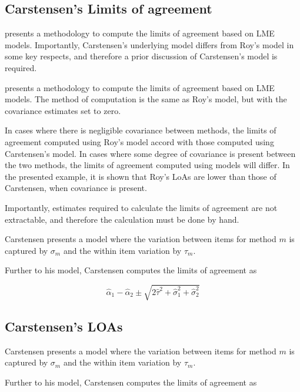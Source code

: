 \documentclass[12pt, a4paper]{report}
\theoremstyle{plain}
\theoremstyle{definition}
\theoremstyle{remark}
\begin{document}
\subsection{Carstensen's Limits of agreement}
\citet{BXC2008} presents a methodology to compute the limits of
agreement based on LME models. Importantly, Carstensen's underlying model differs from Roy's model in some key respects, and therefore a prior discussion of Carstensen's model is required.

\citet{BXC2008} presents a methodology to compute the limits of agreement based on LME models. The method of computation is the same as Roy's model, but with the covariance estimates set to zero.

In cases where there is negligible covariance between methods, the limits of agreement computed using Roy's model accord with those computed using Carstensen's model. In cases where some degree of
covariance is present between the two methods, the limits of agreement computed using models will differ. In the presented example, it is shown that Roy's LoAs are lower than those of Carstensen, when covariance is present.

Importantly, estimates required to calculate the limits of agreement are not extractable, and therefore the calculation must be done by hand.


Carstensen presents a model where the variation between items for
method $m$ is captured by $\sigma_m$ and the within item variation
by $\tau_m$.

Further to his model, Carstensen computes the limits of agreement
as

\[
\hat{\alpha}_1 - \hat{\alpha}_2 \pm \sqrt{2 \hat{\tau}^2 +
	\hat{\sigma}^2_1 + \hat{\sigma}^2_2}
\]

	\subsection{Carstensen's LOAs}
	
	
	Carstensen presents a model where the variation between items for
	method $m$ is captured by $\sigma_m$ and the within item variation
	by $\tau_m$.
	
	Further to his model, Carstensen computes the limits of agreement
	as
	
\end{document}
